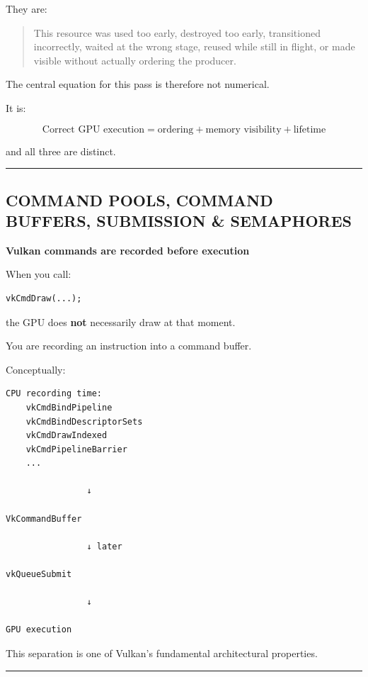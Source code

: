 They are:

\begin{quote}
This resource was used too early, destroyed too early, transitioned incorrectly, waited at the wrong stage, reused while still in flight, or made visible without actually ordering the producer.
\end{quote}

The central equation for this pass is therefore not numerical.

It is:

\[
\boxed{
\text{Correct GPU execution}
=
\text{ordering}
+
\text{memory visibility}
+
\text{lifetime}
}
\]

and all three are distinct.

\begin{center}\rule{0.5\linewidth}{0.5pt}\end{center}

\subsection{COMMAND POOLS, COMMAND BUFFERS, SUBMISSION \& SEMAPHORES}\label{05-engine-i-ch021-command-pools-command-buffers-submission-semaphores}

\textbf{Vulkan commands are recorded before execution}

When you call:

\begin{verbatim}
vkCmdDraw(...);
\end{verbatim}

the GPU does \textbf{not} necessarily draw at that moment.

You are recording an instruction into a command buffer.

Conceptually:

\begin{verbatim}
CPU recording time:
    vkCmdBindPipeline
    vkCmdBindDescriptorSets
    vkCmdDrawIndexed
    vkCmdPipelineBarrier
    ...

                ↓

VkCommandBuffer

                ↓ later

vkQueueSubmit

                ↓

GPU execution
\end{verbatim}

This separation is one of Vulkan's fundamental architectural properties.

\begin{center}\rule{0.5\linewidth}{0.5pt}\end{center}

